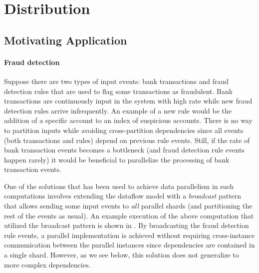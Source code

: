 \section{Distribution}
\label{sec:distribution}

\subsection{Motivating Application}
\label{ssec:motivating-application}

\paragraph{Fraud detection}
Suppose there are two types of input events: bank transactions and fraud detection rules
that are used to flag some transactions as fraudulent. Bank
transactions are continuously input in the system with high rate while new
fraud detection rules arrive infrequently. An example of a new rule would
be the addition of a specific account to an index of suspicious accounts.
There is no way to partition inputs while
avoiding cross-partition dependencies since all events (both
transactions and rules) depend on previous rule events. Still, if the
rate of bank transaction events becomes a bottleneck (and fraud
detection rule events happen rarely) it would be beneficial to
parallelize the processing of bank transaction events.

One of the solutions that has been used to achieve data parallelism in
such computations involves extending the dataflow model with a
\emph{broadcast} pattern that allows sending some input events to \emph{all}
parallel shards (and partitioning the rest of the events as usual). An
example execution of the above computation that utilized the broadcast
pattern is shown in . By
broadcasting the fraud detection rule events, a parallel implementation
is achieved without requiring cross-instance communication between the
parallel instances since dependencies are contained in a single
shard. However, as we see below, this solution does not generalize to
more complex dependencies.

